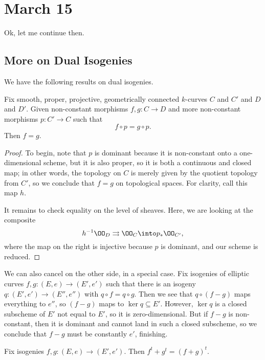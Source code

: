 \documentclass[../notes.tex]{subfiles}
\begin{document}
\section{March 15}

Ok, let me continue then.

\subsection{More on Dual Isogenies}
We have the following results on dual isogenies.
\begin{lemma} \label{lem:cancel-right}
	Fix smooth, proper, projective, geometrically connected $k$-curves $C$ and $C'$ and $D$ and $D'$. Given non-constant morphisms $f,g\colon C\to D$ and more non-constant morphisms $p\colon C'\to C$ such that
	\[f\circ p=g\circ p.\]
	Then $f=g$.
\end{lemma}
\begin{proof}
	To begin, note that $p$ is dominant because it is non-constant onto a one-dimensional scheme, but it is also proper, so it is both a continuous and closed map; in other words, the topology on $C$ is merely given by the quotient topology from $C'$, so we conclude that $f=g$ on topological spaces. For clarity, call this map $h$.

	It remains to check equality on the level of sheaves. Here, we are looking at the composite
	\[h^{-1}\OO_D\rightrightarrows\OO_C\into p_*\OO_{C'},\]
	where the map on the right is injective because $p$ is dominant, and our scheme is reduced.
\end{proof}
\begin{remark} \label{rem:cancel-left}
	We can also cancel on the other side, in a special case. Fix isogenies of elliptic curves $f,g\colon(E,e)\to(E',e')$ such that there is an isogeny $q\colon(E',e')\to(E'',e'')$ with $q\circ f=q\circ g$. Then we see that $q\circ(f-g)$ maps everything to $e''$, so $(f-g)$ maps to $\ker q\subseteq E'$. However, $\ker q$ is a closed subscheme of $E'$ not equal to $E'$, so it is zero-dimensional. But if $f-g$ is non-constant, then it is dominant and cannot land in such a closed subscheme, so we conclude that $f-g$ must be constantly $e'$, finishing.
\end{remark}
\begin{proposition} \label{lem:dual-add}
	Fix isogenies $f,g\colon(E,e)\to(E',e')$. Then $f^t+g^t=(f+g)^t$.
\end{proposition}
\end{document}
